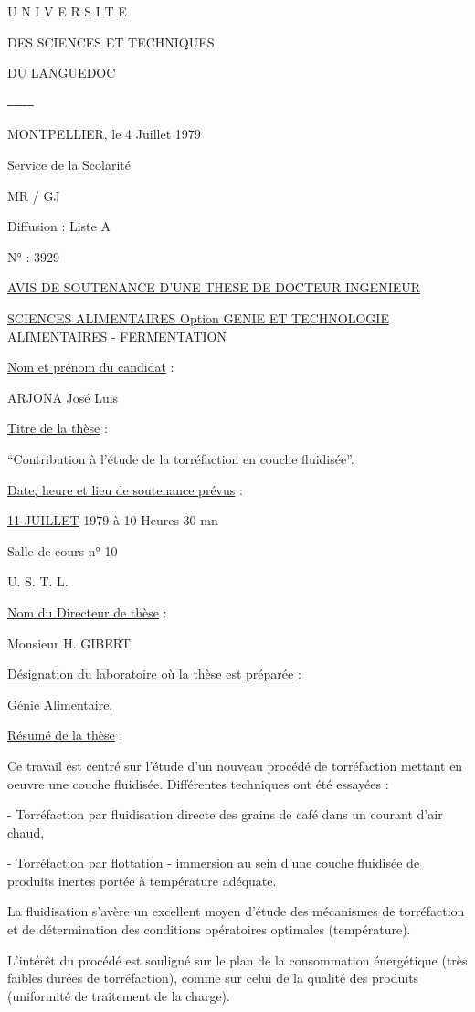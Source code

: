 U N I V E R S I T E

DES SCIENCES ET TECHNIQUES

DU LANGUEDOC

\texttt{------------}

MONTPELLIER, le 4 Juillet 1979

Service de la Scolarité

MR / GJ

Diffusion : Liste A

N° : 3929

\uline{AVIS DE SOUTENANCE D'UNE THESE DE DOCTEUR INGENIEUR}

\uline{SCIENCES ALIMENTAIRES Option GENIE ET TECHNOLOGIE ALIMENTAIRES - FERMENTATION}

\uline{Nom et prénom du candidat} :

ARJONA José Luis

\uline{Titre de la thèse} :

``Contribution à l'étude de la torréfaction en couche fluidisée''.

\uline{Date, heure et lieu de soutenance prévus} :

\uline{11 JUILLET} 1979 à 10 Heures 30 mn

Salle de cours n° 10

U. S. T. L.

\uline{Nom du Directeur de thèse} :

Monsieur H. GIBERT

\uline{Désignation du laboratoire où la thèse est préparée} :

Génie Alimentaire.

\uline{Résumé de la thèse} :

Ce travail est centré sur l'étude d'un nouveau procédé de torréfaction mettant en oeuvre une couche fluidisée. Différentes techniques ont été essayées :

- Torréfaction par fluidisation directe des grains de café dans un courant d'air chaud,

- Torréfaction par flottation - immersion au sein d'une couche fluidisée de produits inertes portée à température adéquate.

La fluidisation s'avère un excellent moyen d'étude des mécanismes de torréfaction et de détermination des conditions opératoires optimales (température).

L'intérêt du procédé est souligné sur le plan de la consommation énergétique (très faibles durées de torréfaction), comme sur celui de la qualité des produits (uniformité de traitement de la charge).

